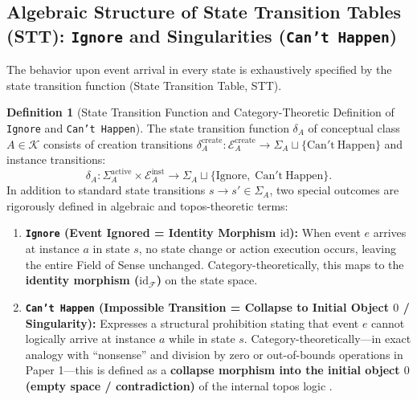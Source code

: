 \documentclass[11pt,a4paper]{article}
\theoremstyle{definition}
\newtheorem{definition}{Definition}[section]
\theoremstyle{plain}
\theoremstyle{remark}
\newcommand{\id}{\mathrm{id}}
\begin{document}
\subsection{Algebraic Structure of State Transition Tables (STT): \texttt{Ignore} and Singularities (\texttt{Can't Happen})}
The behavior upon event arrival in every state is exhaustively specified by the state transition function (State Transition Table, STT).

\begin{definition}[State Transition Function and Category-Theoretic Definition of \texttt{Ignore} and \texttt{Can't Happen}]\label{def:stt}
The state transition function $\delta_A$ of conceptual class $A \in \mathcal{K}$ consists of creation transitions $\delta_A^{\mathrm{create}} : \mathcal{E}_A^{\mathrm{create}} \to \Sigma_A \sqcup \{\mathrm{Can't\ Happen}\}$ and instance transitions:
\begin{equation}
\delta_A : \Sigma_A^{\mathrm{active}} \times \mathcal{E}_A^{\mathrm{inst}} \longrightarrow \Sigma_A \sqcup \{\mathrm{Ignore},\; \mathrm{Can't\ Happen}\}.
\end{equation}
In addition to standard state transitions $s \to s' \in \Sigma_A$, two special outcomes are rigorously defined in algebraic and topos-theoretic terms:
\begin{enumerate}
    \item \textbf{\texttt{Ignore} (Event Ignored = Identity Morphism $\id$):} When event $e$ arrives at instance $a$ in state $s$, no state change or action execution occurs, leaving the entire Field of Sense unchanged. Category-theoretically, this maps to the \textbf{identity morphism ($\id_{\mathcal{F}}$)} on the state space.
    \item \textbf{\texttt{Can't Happen} (Impossible Transition = Collapse to Initial Object $0$ / Singularity):} Expresses a structural prohibition stating that event $e$ cannot logically arrive at instance $a$ while in state $s$. Category-theoretically---in exact analogy with ``nonsense'' and division by zero or out-of-bounds operations in Paper 1---this is defined as a \textbf{collapse morphism into the initial object $0$ (empty space / contradiction)} of the internal topos logic \cite{maclane1992}.
\end{enumerate}
\end{definition}
\end{document}
